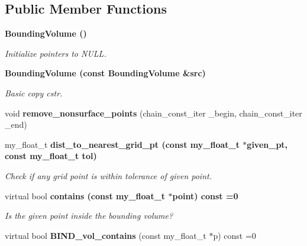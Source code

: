 \subsection*{Public Member Functions}
\begin{CompactItemize}
\item 
\bf{Bounding\-Volume} ()\label{classSimSite3D_1_1BoundingVolume_9fe70d0dcf235dd947304b1259e5dab3}

\begin{CompactList}\small\item\em Initialize pointers to NULL. \item\end{CompactList}\item 
\bf{Bounding\-Volume} (const \bf{Bounding\-Volume} \&src)\label{classSimSite3D_1_1BoundingVolume_460f07f7011383ee3bde18324fb216d8}

\begin{CompactList}\small\item\em Basic copy cstr. \item\end{CompactList}\item 
void \textbf{remove\_\-nonsurface\_\-points} (chain\_\-const\_\-iter \_\-begin, chain\_\-const\_\-iter \_\-end)\label{classSimSite3D_1_1BoundingVolume_7a552d8708eddcb0eb4b8af247eed3f3}

\item 
my\_\-float\_\-t \bf{dist\_\-to\_\-nearest\_\-grid\_\-pt} (const my\_\-float\_\-t $\ast$given\_\-pt, const my\_\-float\_\-t tol)\label{classSimSite3D_1_1BoundingVolume_29b827ac0631889832a23a6c3ccd73ad}

\begin{CompactList}\small\item\em Check if any grid point is within tolerance of given point. \item\end{CompactList}\item 
virtual bool \bf{contains} (const my\_\-float\_\-t $\ast$point) const =0\label{classSimSite3D_1_1BoundingVolume_4845f90aaeb0bdda5a7bab8ad69f249a}

\begin{CompactList}\small\item\em Is the given point inside the bounding volume? \item\end{CompactList}\item 
virtual bool \textbf{BIND\_\-vol\_\-contains} (const my\_\-float\_\-t $\ast$p) const =0\label{classSimSite3D_1_1BoundingVolume_fac13641d7742a874bdf8fc12bde2183}


\end{CompactItemize}
